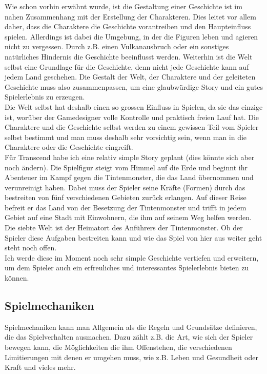 \documentclass[12pt,a4paper,titlepage]{article}
\begin{document}
		 Wie schon vorhin erwähnt wurde, ist die Gestaltung einer Geschichte ist im nahen Zusammenhang mit der Erstellung der Charakteren. Dies leitet vor allem daher, dass die Charaktere die Geschichte vorantreiben und den Haupteinfluss spielen. Allerdings ist dabei die Umgebung, in der die Figuren leben und agieren nicht zu vergessen. Durch z.B. einen Vulkanausbruch oder ein sonstiges natürliches Hindernis die Geschichte beeinflusst werden. Weiterhin ist die Welt selbst eine Grundlage für die Geschichte, denn nicht jede Geschichte kann auf jedem Land geschehen. Die Gestalt der Welt, der Charaktere und der geleiteten Geschichte muss also zusammenpassen, um eine glaubwürdige Story und ein gutes Spielerlebnis zu erzeugen.\\
		 
		 Die Welt selbst hat deshalb einen so grossen Einfluss in Spielen, da sie das einzige ist, worüber der Gamedesigner volle Kontrolle und praktisch freien Lauf hat. Die Charaktere und die Geschichte selbst werden zu einem gewissen Teil vom Spieler selbst bestimmt und man muss deshalb sehr vorsichtig sein, wenn man in die Charaktere oder die Geschichte eingreift.\\
		 
		 Für Transcend habe ich eine relativ simple Story geplant (dies könnte sich aber noch ändern). Die Spielfigur steigt vom Himmel auf die Erde und beginnt ihr Abenteuer im Kampf gegen die Tintenmonster, die das Land übernommen und verunreinigt haben. Dabei muss der Spieler seine Kräfte (Formen) durch das bestreiten von fünf verschiedenen Gebieten zurück erlangen. Auf dieser Reise befreit er das Land von der Besetzung der Tintenmonster und trifft in jedem Gebiet auf eine Stadt mit Einwohnern, die ihm auf seinem Weg helfen werden. Die siebte Welt ist der Heimatort des Anführers der Tintenmonster. Ob der Spieler diese Aufgaben bestreiten kann und wie das Spiel von hier aus weiter geht steht noch offen.\\
		 
		 Ich werde diese im Moment noch sehr simple Geschichte vertiefen und erweitern, um dem Spieler auch ein erfreuliches und interessantes Spielerlebnis bieten zu können. 
		
	\subsection{Spielmechaniken}
		Spielmechaniken kann man Allgemein als die Regeln und Grundsätze definieren, die das Spielverhalten ausmachen. Dazu zählt z.B. die Art, wie sich der Spieler bewegen kann, die Möglichkeiten die ihm Offenstehen, die verschiedenen Limitierungen mit denen er umgehen muss, wie z.B. Leben und Gesundheit oder Kraft und vieles mehr.\\
		
\end{document}
